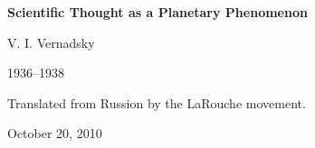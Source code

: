 \begin{titlepage}

\begin{center}
\Huge\textbf{Scientific Thought as a Planetary Phenomenon}


\bigskip
\LARGE{V. I. Vernadsky}

\Large{1936--1938}


\bigskip
\Large{Translated from Russion by the LaRouche movement.}
\foreignlanguage{russian}{\nocite{vernadsky1938thought-lib.ru}}

October 20, 2010
\end{center}

\end{titlepage}
